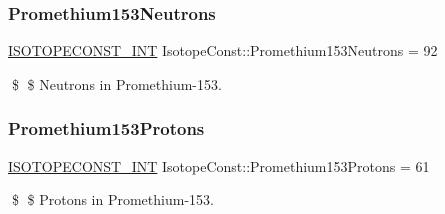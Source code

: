 \subsubsection{\texorpdfstring{Promethium153\+Neutrons}{Promethium153Neutrons}}
{\footnotesize\ttfamily \mbox{\hyperlink{group___isotope_const-_macros_ga5f18360b3e99483a35c32d789e62621c}{I\+S\+O\+T\+O\+P\+E\+C\+O\+N\+S\+T\+\_\+\+I\+NT}} Isotope\+Const\+::\+Promethium153\+Neutrons = 92}

\$ \$ Neutrons in Promethium-\/153. \mbox{\label{group___isotope_const-_promethium-_pm153_ga9306c714d619396d9aa2ebdd82889d35}} 
\subsubsection{\texorpdfstring{Promethium153\+Protons}{Promethium153Protons}}
{\footnotesize\ttfamily \mbox{\hyperlink{group___isotope_const-_macros_ga5f18360b3e99483a35c32d789e62621c}{I\+S\+O\+T\+O\+P\+E\+C\+O\+N\+S\+T\+\_\+\+I\+NT}} Isotope\+Const\+::\+Promethium153\+Protons = 61}

\$ \$ Protons in Promethium-\/153. 